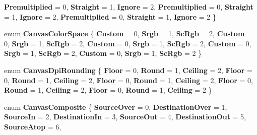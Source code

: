 \begin{DoxyCompactItemize}
{\bfseries Premultiplied} = 0, 
{\bfseries Straight} = 1, 
\newline
{\bfseries Ignore} = 2, 
{\bfseries Premultiplied} = 0, 
{\bfseries Straight} = 1, 
{\bfseries Ignore} = 2, 
\newline
{\bfseries Premultiplied} = 0, 
{\bfseries Straight} = 1, 
{\bfseries Ignore} = 2
 \}
\item 
\mbox{\label{namespace_microsoft_1_1_graphics_1_1_canvas_a968dbdb8c3779105d9af1ee42d19efa5}} 
enum {\bfseries Canvas\+Color\+Space} \{ \newline
{\bfseries Custom} = 0, 
{\bfseries Srgb} = 1, 
{\bfseries Sc\+Rgb} = 2, 
{\bfseries Custom} = 0, 
\newline
{\bfseries Srgb} = 1, 
{\bfseries Sc\+Rgb} = 2, 
{\bfseries Custom} = 0, 
{\bfseries Srgb} = 1, 
\newline
{\bfseries Sc\+Rgb} = 2, 
{\bfseries Custom} = 0, 
{\bfseries Srgb} = 1, 
{\bfseries Sc\+Rgb} = 2, 
\newline
{\bfseries Custom} = 0, 
{\bfseries Srgb} = 1, 
{\bfseries Sc\+Rgb} = 2
 \}
\item 
\mbox{\label{namespace_microsoft_1_1_graphics_1_1_canvas_aaf9bdf2614ae3a2c3978ef7522070d82}} 
enum {\bfseries Canvas\+Dpi\+Rounding} \{ \newline
{\bfseries Floor} = 0, 
{\bfseries Round} = 1, 
{\bfseries Ceiling} = 2, 
{\bfseries Floor} = 0, 
\newline
{\bfseries Round} = 1, 
{\bfseries Ceiling} = 2, 
{\bfseries Floor} = 0, 
{\bfseries Round} = 1, 
\newline
{\bfseries Ceiling} = 2, 
{\bfseries Floor} = 0, 
{\bfseries Round} = 1, 
{\bfseries Ceiling} = 2, 
\newline
{\bfseries Floor} = 0, 
{\bfseries Round} = 1, 
{\bfseries Ceiling} = 2
 \}
\item 
\mbox{\label{namespace_microsoft_1_1_graphics_1_1_canvas_ad4d6dae38d1a118a5742bdb597529f1e}} 
enum {\bfseries Canvas\+Composite} \{ \newline
{\bfseries Source\+Over} = 0, 
{\bfseries Destination\+Over} = 1, 
{\bfseries Source\+In} = 2, 
{\bfseries Destination\+In} = 3, 
\newline
{\bfseries Source\+Out} = 4, 
{\bfseries Destination\+Out} = 5, 
{\bfseries Source\+Atop} = 6, 

\end{DoxyCompactItemize}
